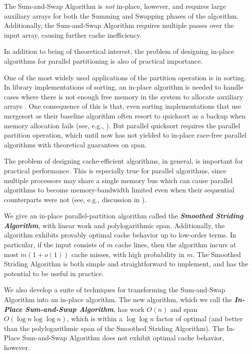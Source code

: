 \documentclass[11pt]{article}
\newcommand{\defn}[1]{{\textit{\textbf{\boldmath #1}}}}
\renewcommand{\paragraph}[1]{\vspace{0.09in}\noindent{\bf \boldmath #1.}}
\theoremstyle{remark}
\theoremstyle{remark}
\begin{document}
The Sum-and-Swap Algorithm is \emph{not} in-place, however, and
requires large auxiliary arrays for both the Summing and Swapping
phases of the algorithm. Additionally, the Sum-and-Swap Algorithm
requires multiple passes over the input array, causing further cache
inefficiency.

\paragraph{Why Cache Efficiency Matters}
In addition to being of theoretical interest, the problem of designing
in-place algorithms for parallel partitioning is also of practical
importance.

One of the most widely used applications of the partition operation is
in sorting. In library implementations of sorting, an in-place
algorithm is needed to handle cases where there is not enough free
memory in the system to allocate auxiliary arrays \cite{gnu,
  openbsd}. One consequence of this is that, even sorting
implementations that use mergesort as their baseline algorithm often
resort to quicksort as a backup when memory allocation fails (see,
e.g., \cite{gnu}). But parallel quicksort requires the parallel
partition operation, which until now has not yielded to in-place
race-free parallel algorithms with theoretical guarantees on span.

The problem of designing cache-efficient algorithms, in general, is
important for practical performance. This is especially true for
parallel algorithms, since multiple processors may share a single
memory bus which can cause parallel algorithms to become
memory-bandwidth limited even when their sequential counterparts were
not (see, e.g., discussion in \cite{DeakinPrMa18, NiDME09}).

\paragraph{Our Results}
We give an in-place parallel-partition algorithm called the
\defn{Smoothed Striding Algorithm}, with linear work and
polylogarithmic span. Additionally, the algorithm exhibits provably
optimal cache behavior up to low-order terms. In particular, if the
input consists of $m$ cache lines, then the algorithm incurs at most
$m(1 + o(1))$ cache misses, with high probability in $m$. The Smoothed
Striding Algorithm is both simple and straightforward to implement,
and has the potential to be useful in practice.

We also develop a suite of techniques for transforming the
Sum-and-Swap Algorithm into an in-place algorithm. The new algorithm,
which we call the \defn{In-Place Sum-and-Swap Algorithm}, has work
$O(n)$ and span $O(\log n \log \log n)$, which is within a
$\log \log n$ factor of optimal (and better than the polylogarithmic
span of the Smoothed Striding Algorithm). The In-Place Sum-and-Swap
Algorithm does not exhibit optimal cache behavior, however.
\end{document}
